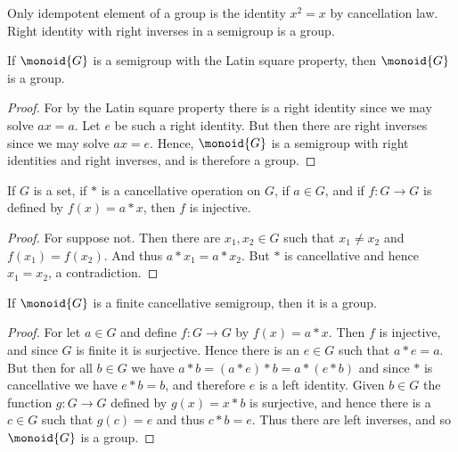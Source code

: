 \documentclass{article}                                                        %
\begin{document}
            Only idempotent element of a group is the identity $x^{2}=x$ by
            cancellation law. Right identity with right inverses in a semigroup
            is a group.
            \begin{theorem}
                If $\monoid{G}$ is a semigroup with the Latin square property,
                then $\monoid{G}$ is a group.
            \end{theorem}
            \begin{proof}
                For by the Latin square property there is a right identity since
                we may solve $ax=a$. Let $e$ be such a right identity. But then
                there are right inverses since we may solve $ax=e$. Hence,
                $\monoid{G}$ is a semigroup with right identities and right
                inverses, and is therefore a group.
            \end{proof}
            \begin{theorem}
                If $G$ is a set, if $*$ is a cancellative operation on $G$,
                if $a\in{G}$, and if $f:G\rightarrow{G}$ is defined by
                $f(x)=a*x$, then $f$ is injective.
            \end{theorem}
            \begin{proof}
                For suppose not. Then there are $x_{1},x_{2}\in{G}$ such that
                $x_{1}\ne{x}_{2}$ and $f(x_{1})=f(x_{2})$. And thus
                $a*x_{1}=a*x_{2}$. But $*$ is cancellative and hence
                $x_{1}=x_{2}$, a contradiction.
            \end{proof}
            \begin{theorem}
                If $\monoid{G}$ is a finite cancellative semigroup, then it is
                a group.
            \end{theorem}
            \begin{proof}
                For let $a\in{G}$ and define $f:G\rightarrow{G}$ by
                $f(x)=a*x$. Then $f$ is injective, and since $G$ is finite it is
                surjective. Hence there is an $e\in{G}$ such that $a*e=a$. But
                then for all $b\in{G}$ we have $a*b=(a*e)*b=a*(e*b)$ and since
                $*$ is cancellative we have $e*b=b$, and therefore $e$ is a
                left identity. Given $b\in{G}$ the function $g:G\rightarrow{G}$
                defined by $g(x)=x*b$ is surjective, and hence there is a
                $c\in{G}$ such that $g(c)=e$ and thus $c*b=e$. Thus there are
                left inverses, and so $\monoid{G}$ is a group.
            \end{proof}
\end{document}
